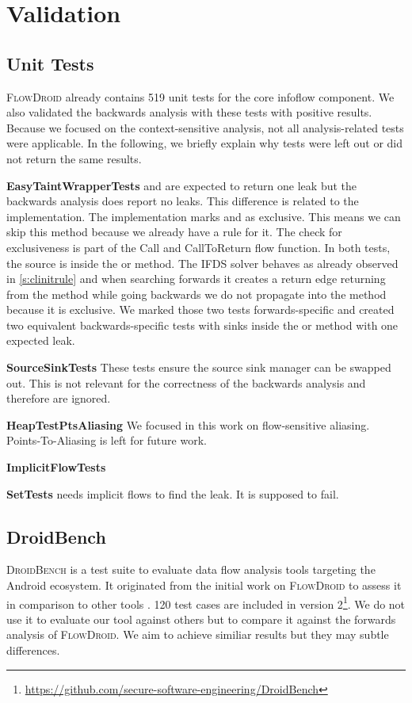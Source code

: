 \documentclass[../draft.tex]{subfiles}
\begin{document}
    \chapter{Validation}
    \section{Unit Tests}
    \textsc{FlowDroid} already contains 519 unit tests for the core infoflow component. We also validated the backwards analysis with these tests with positive results. Because we focused on the context-sensitive analysis, not all analysis-related tests were applicable. In the following, we briefly explain why tests were left out or did not return the same results.

    \textbf{EasyTaintWrapperTests}  and  are expected to return one leak but the backwards analysis does report no leaks. This difference is related to the  implementation. The implementation marks  and  as exclusive. This means we can skip this method because we already have a rule for it. The check for exclusiveness is part of the Call and CallToReturn flow function. In both tests, the source is inside the  or  method. The IFDS solver behaves as already observed in \autoref{s:clinitrule} and when searching forwards it creates a return edge returning from the method while going backwards we do not propagate into the method because it is exclusive.
    We marked those two tests forwards-specific and created two equivalent backwards-specific tests with sinks inside the  or  method with one expected leak.
    
    \textbf{SourceSinkTests} These tests ensure the source sink manager can be swapped out. This is not relevant for the correctness of the backwards analysis and therefore are ignored.

    \textbf{HeapTestPtsAliasing} We focused in this work on flow-sensitive aliasing. Points-To-Aliasing is left for future work.
    
    \textbf{ImplicitFlowTests} 

    \textbf{SetTests}  needs implicit flows to find the leak. It is supposed to fail.

    \section{DroidBench}
    \textsc{DroidBench} is a test suite to evaluate data flow analysis tools targeting the Android ecosystem. It originated from the initial work on \textsc{FlowDroid} to assess it in comparison to other tools \cite{Arzt2014}. 120 test cases are included in version 2\footnote{\url{https://github.com/secure-software-engineering/DroidBench}}.
    We do not use it to evaluate our tool against others but to compare it against the forwards analysis of \textsc{FlowDroid}. We aim to achieve similiar results but they may subtle differences.
    
\end{document}
